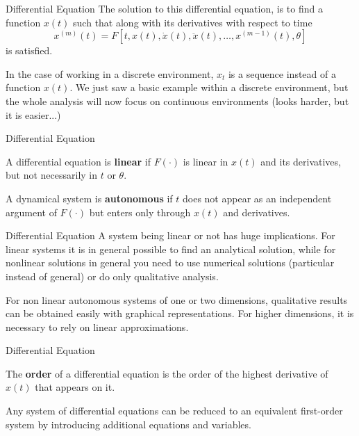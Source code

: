 \documentclass[aspectratio=169, handout]{beamer}
\begin{document}
\begin{frame}{Differential Equation}
    The solution to this differential equation, is to find a function $x(t)$ such that along with its derivatives with respect to time \[x^{(m)}(t)=F[t,x(t),\dot{x}(t),\ddot{x}(t),\ldots,x^{(m-1)}(t),\theta]\] is satisfied.
    
    \vspace{0.5cm}
    
    In the case of working in a discrete environment, $x_t$ is a sequence instead of a function $x(t)$. We just saw a basic example within a discrete environment, but the whole analysis will now focus on continuous environments (looks harder, but it is easier...)
\end{frame}

\begin{frame}{Differential Equation}
    \begin{definition}
        A differential equation is \textbf{linear} if $F(\cdot)$ is linear in $x(t)$ and its derivatives, but not necessarily in $t$ or $\theta$.
    \end{definition}
    \begin{definition}
        A dynamical system is \textbf{autonomous} if $t$ does not appear as an independent argument of $F(\cdot)$ but enters only through $x(t)$ and derivatives.
    \end{definition}
\end{frame}

\begin{frame}{Differential Equation}
    A system being linear or not has huge implications. For linear systems it is in general possible to find an analytical solution, while for nonlinear solutions in general you need to use numerical solutions (particular instead of general) or do only qualitative analysis.
    
    \vspace{0.5cm}
    
    For non linear autonomous systems of one or two dimensions, qualitative results can be obtained easily with graphical representations. For higher dimensions, it is necessary to rely on linear approximations.
    
\end{frame}

\begin{frame}{Differential Equation}
    \begin{definition}
    The \textbf{order} of a differential equation is the order of the highest derivative of $x(t)$ that appears on it.
    \end{definition}
    \begin{fact}
        Any system of differential equations can be reduced to an equivalent first-order system by introducing additional equations and variables.
    \end{fact}
\end{frame}
\end{document}
